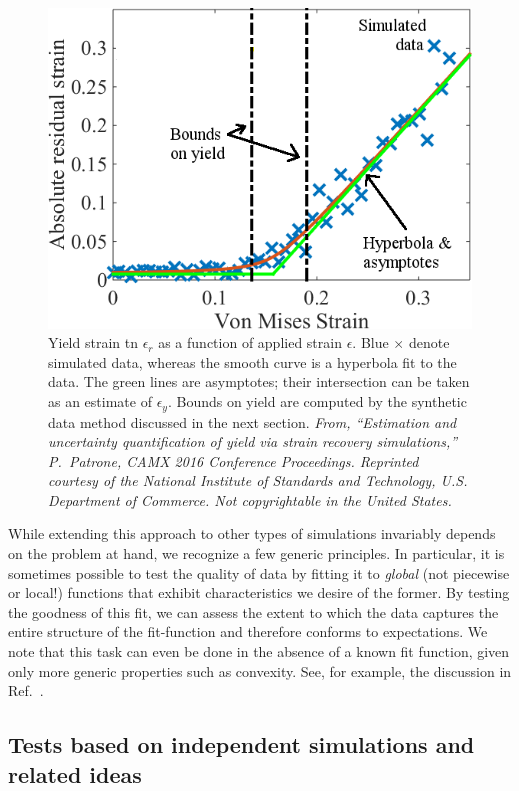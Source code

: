 \begin{figure}
  \centering
  \includegraphics[width=0.9\linewidth]{hyperbola.png}
  \caption{Yield strain tn $\epsilon_r$ as a function of applied strain $\epsilon$.  Blue $\times$ denote simulated data, whereas the smooth curve is a hyperbola fit to the data.  The green lines are asymptotes; their intersection can be taken as an estimate of $\epsilon_y$.    Bounds on yield are computed by the synthetic data method discussed in the next section.  {\it From, ``Estimation and uncertainty quantification of yield via strain recovery simulations,'' P.\ Patrone, CAMX 2016 Conference Proceedings.  Reprinted courtesy of the National Institute of Standards and Technology, U.S. Department of Commerce. Not copyrightable in the United States.}}
  \label{fig:yield}
\end{figure}

While extending this approach to other types of simulations invariably depends on the problem at hand, we recognize a few generic principles.  In particular, it is sometimes possible to test the quality of data by fitting it to {\it global} (not piecewise or local!) functions that exhibit characteristics we desire of the former.  By testing the goodness of this fit, we can assess the extent to which the data captures the entire structure of the fit-function and therefore conforms to expectations.  We note that this task can even be done in the absence of a known fit function, given only more generic properties such as convexity.  See, for example, the discussion in Ref.~\cite{PatroneAIAA}.  


\subsection{Tests based on independent simulations and related ideas}

